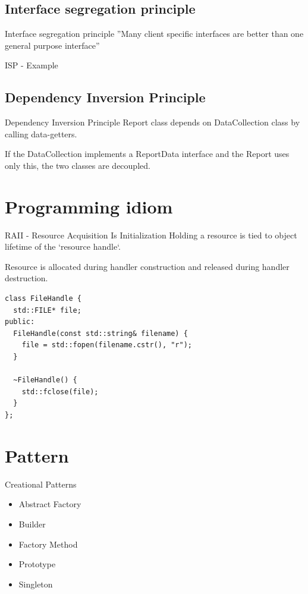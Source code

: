 \documentclass{beamer}
\begin{document}
\subsection{Interface segregation principle}

\begin{frame}{Interface segregation principle}
''Many client specific interfaces are better than one general purpose
interface''
\end{frame}

\begin{frame}{ISP - Example}
\end{frame}


\subsection{Dependency Inversion Principle}

\begin{frame}{Dependency Inversion Principle}
Report class depends on DataCollection class by calling data-getters.

If the DataCollection implements a ReportData interface and the Report uses only
this, the two classes are decoupled.
\end{frame}

\section{Programming idiom}
\begin{frame}[fragile]{RAII - Resource Acquisition Is Initialization}
Holding a resource is tied to object lifetime of the `resource handle`.
\par
Resource is allocated during handler construction and released during handler
destruction.

\begin{lstlisting}
class FileHandle {
  std::FILE* file;
public:
  FileHandle(const std::string& filename) {
    file = std::fopen(filename.cstr(), "r");
  }
  
  ~FileHandle() {
    std::fclose(file);
  }
};
\end{lstlisting}
\end{frame}

\section{Pattern}

\begin{frame}{Creational Patterns}
\begin{itemize}
  \item Abstract Factory
  \item Builder
  \item Factory Method
  \item Prototype
  \item Singleton
\end{itemize}
\end{frame}
\end{document}
